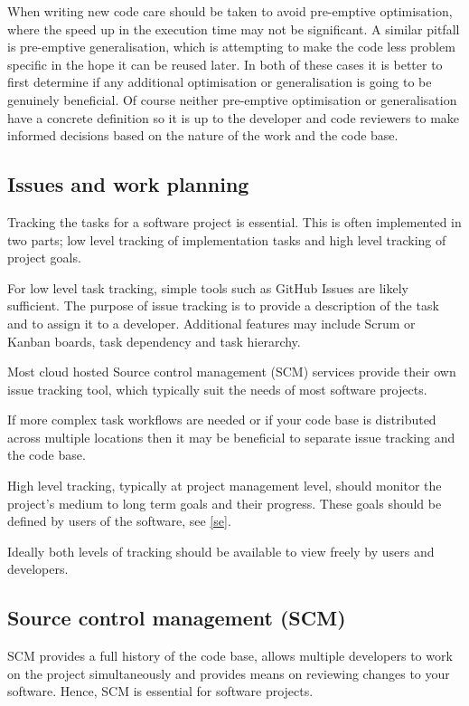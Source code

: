 \documentclass[jnr]{iosart2x}
\begin{document}
\begin{itemzie}
When writing new code care should be taken to avoid pre-emptive optimisation, where the speed up in the execution time may not be significant.
A similar pitfall is pre-emptive generalisation, which is attempting to make the code less problem specific in the hope it can be reused later.
In both of these cases it is better to first determine if any additional optimisation or generalisation is going to be genuinely beneficial.
Of course neither pre-emptive optimisation or generalisation have a concrete definition so it is up to the developer and code reviewers to make informed decisions based on the nature of the work and the code base.

\subsection{Issues and work planning}
\label{Issues and work planning}

Tracking the tasks for a software project is essential.
This is often implemented in two parts; low level tracking of implementation tasks and high level tracking of project goals.

For low level task tracking, simple tools such as GitHub Issues are likely sufficient.
The purpose of issue tracking is to provide a description of the task and to assign it to a developer.
Additional features may include Scrum or Kanban boards, task dependency and task hierarchy.

Most cloud hosted Source control management (SCM) services provide their own issue tracking tool, which typically suit the needs of most software projects.

If more complex task workflows are needed or if your code base is distributed across multiple locations then it may be beneficial to separate issue tracking and the code base.

High level tracking, typically at project management level, should monitor the project's medium to long term goals and their progress.
These goals should be defined by users of the software, see \ref{se}.

Ideally both levels of tracking should be available to view freely by users and developers.

\subsection{Source control management (SCM)}
\label{Source control management}

SCM provides a full history of the code base, allows multiple developers to work on the project simultaneously and provides means on reviewing changes to your software.
Hence, SCM is essential for software projects.


\end{itemzie}
\end{document}

